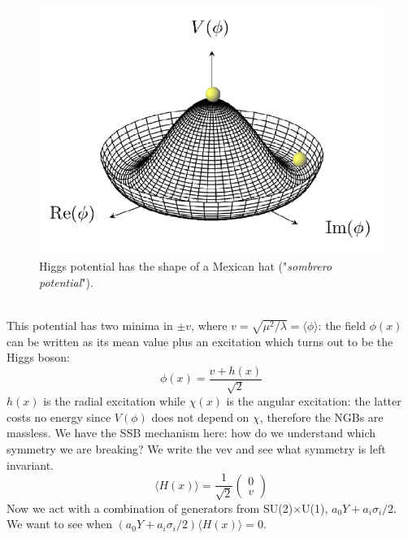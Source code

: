 \documentclass[../main.tex]{subfiles}
\begin{document}
\begin{figure}[h!]
    \centering
    \includegraphics{Images/sombrero.png}
    \caption{Higgs potential has the shape of a Mexican hat ("\textit{sombrero potential}").}
\end{figure}\\
This potential has two minima in $\pm v$, where $v=\sqrt{\mu^2/\lambda}=\langle\phi\rangle$: the field $\phi(x)$ can be written as its mean value plus an excitation which turns out to be the Higgs boson:
\[
\phi(x)=\frac{v+h(x)}{\sqrt{2}}
\]
$h(x)$ is the radial excitation while $\chi(x)$ is the angular excitation: the latter costs no energy since $V(\phi)$ does not depend on $\chi$, therefore the NGBs are massless. We have the SSB mechanism here: how do we understand which symmetry we are breaking? We write the vev and see what symmetry is left invariant.
\[
\langle H(x)\rangle=\frac{1}{\sqrt{2}}\begin{pmatrix}
    0\\v
\end{pmatrix}
\]
Now we act with a combination of generators from SU(2)$\times$U(1), $a_0Y+a_i\sigma_i/2$. We want to see when $(a_0Y+a_i\sigma_i/2)\langle H(x)\rangle=0$.
\end{document}
